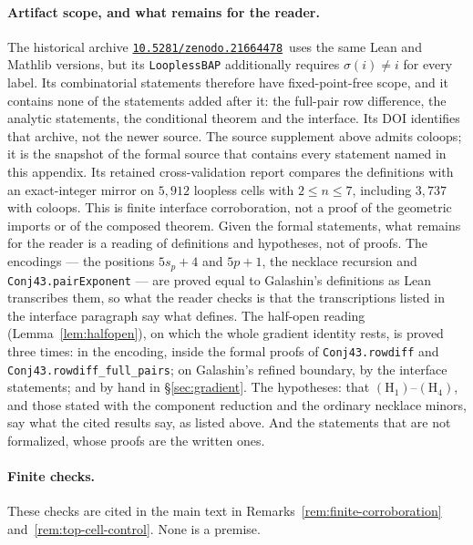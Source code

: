 \documentclass[11pt]{article}
\theoremstyle{definition}
\newcommand{\CertDOI}{\href{https://doi.org/10.5281/zenodo.21664478}{\nolinkurl{10.5281/zenodo.21664478}}}
\begin{document}
\paragraph{Artifact scope, and what remains for the reader.}
The historical archive \CertDOI\ uses the same Lean and Mathlib versions,
but its \texttt{LooplessBAP} additionally requires
$\sigma(i)\ne i$ for every label. Its combinatorial statements therefore have
fixed-point-free scope, and it contains none of the statements added after it: the full-pair row
difference, the analytic statements, the conditional theorem and the interface. Its DOI identifies
that archive, not the newer source.
The source supplement above admits
coloops; it is the snapshot of the formal source that contains every statement named in this
appendix. Its retained cross-validation report compares the definitions with an exact-integer mirror on
$5{,}912$ loopless cells with $2\le n\le7$, including $3{,}737$ with coloops. This is finite interface
corroboration, not a proof of the geometric imports or of the composed theorem. Given the formal statements, what remains for the reader is a reading of definitions and
hypotheses, not of proofs. The encodings --- the positions $5s_p+4$ and $5p+1$, the necklace recursion
and \texttt{Conj43.\allowbreak pairExponent} --- are proved equal to Galashin's definitions as Lean transcribes
them, so what the reader checks is that the transcriptions listed in the interface paragraph say what
\cite{Galashin} defines. The half-open reading (Lemma~\ref{lem:halfopen}), on which the whole gradient
identity rests, is proved three times: in the encoding, inside the formal proofs of
\texttt{Conj43.\allowbreak rowdiff} and \texttt{Conj43.\allowbreak rowdiff\_\allowbreak full\_\allowbreak pairs}; on Galashin's refined boundary, by the
interface statements; and by hand in \S\ref{sec:gradient}. The hypotheses: that
$(\mathrm H_1)$--$(\mathrm H_4)$, and those stated with the component reduction and the ordinary necklace minors,
say what the cited results say, as listed above. And the statements that
are not formalized, whose proofs are the written ones.

\paragraph{Finite checks.}
These checks are cited in the main text in Remarks~\ref{rem:finite-corroboration}
and~\ref{rem:top-cell-control}. None is a premise.
\end{document}
